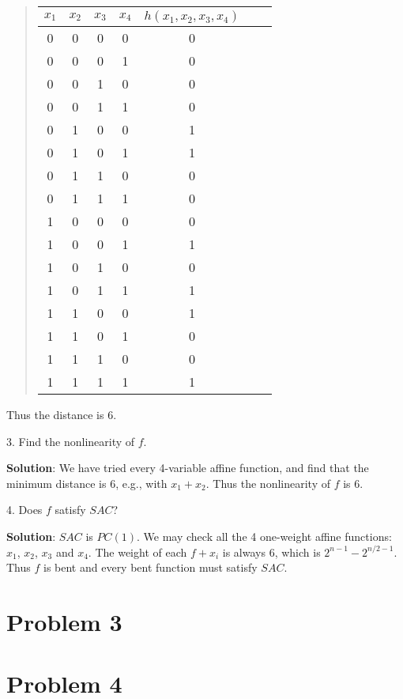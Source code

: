 \documentclass[12pt]{article}
\theoremstyle{plain}
\begin{document}
\begin{quote}
\begin{tabular}{c c c c| c || c || c }
$x_1$ & $x_2$ & $x_3$ & $x_4$ & $h(x_1, x_2, x_3, x_4)$ \\
\hline
0 & 0 & 0 & 0 & 0 \\
0 & 0 & 0 & 1 & 0 \\
0 & 0 & 1 & 0 & 0 \\
0 & 0 & 1 & 1 & 0 \\
0 & 1 & 0 & 0 & 1 \\
0 & 1 & 0 & 1 & 1 \\
0 & 1 & 1 & 0 & 0 \\
0 & 1 & 1 & 1 & 0 \\
1 & 0 & 0 & 0 & 0 \\
1 & 0 & 0 & 1 & 1 \\
1 & 0 & 1 & 0 & 0 \\
1 & 0 & 1 & 1 & 1 \\
1 & 1 & 0 & 0 & 1 \\
1 & 1 & 0 & 1 & 0 \\
1 & 1 & 1 & 0 & 0 \\
1 & 1 & 1 & 1 & 1 \\
\end{tabular}
\end{quote}
Thus the distance is 6.

3. Find the nonlinearity of $f$.

{\bf Solution}: We have tried every 4-variable affine function, and find that the minimum distance is 6, e.g., with $x_1 + x_2$. Thus the nonlinearity of $f$ is 6.

4. Does $f$ satisfy $SAC$?

{\bf Solution}: $SAC$ is $PC(1)$. We may check all the 4 one-weight affine functions: $x_1$, $x_2$, $x_3$ and $x_4$. The weight of each $f+x_i$ is always 6, which is $2^{n-1} - 2^{n/2-1}$. Thus $f$ is bent and every bent function must satisfy $SAC$.


\section{Problem 3}

\section{Problem 4}
\end{document}
